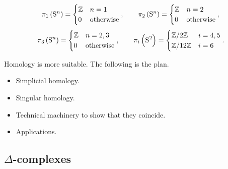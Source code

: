 \begin{example*}
$$ \pi_1\br{\S^n} =
\begin{cases}
\ZZ & n = 1 \\
0 & \text{otherwise}
\end{cases},
\qquad \pi_2\br{\S^n} =
\begin{cases}
\ZZ & n = 2 \\
0 & \text{otherwise}
\end{cases},
$$
$$ \pi_3\br{\S^n} =
\begin{cases}
\ZZ & n = 2, 3 \\
0 & \text{otherwise}
\end{cases},
\qquad \pi_i\br{\S^2} =
\begin{cases}
\ZZ / 2\ZZ & i = 4, 5 \\
\ZZ / 12\ZZ & i = 6
\end{cases}.
$$
\end{example*}

Homology is more suitable. The following is the plan.
\begin{itemize}
\item Simplicial homology.
\item Singular homology.
\item Technical machinery to show that they coincide.
\item Applications.
\end{itemize}

\subsection{\texorpdfstring{$ \Delta $}{Delta}-complexes}

